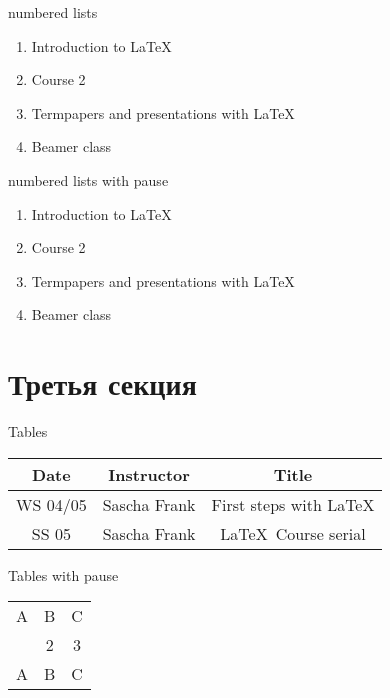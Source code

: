 \documentclass{beamer}
\begin{document}
\begin{frame}{numbered lists}
\begin{enumerate}
\item Introduction to  \LaTeX  
\item Course 2 
\item Termpapers and presentations with \LaTeX 
\item Beamer class
\end{enumerate}
\end{frame}


\begin{frame}{numbered lists with pause}
\begin{enumerate}
\item Introduction to  \LaTeX \pause 
\item Course 2 \pause 
\item Termpapers and presentations with \LaTeX \pause 
\item Beamer class
\end{enumerate}
\end{frame}


\section{Третья секция} 
\begin{frame}{Tables}
\begin{tabular}{|c|c|c|}
\hline
\textbf{Date} & \textbf{Instructor} & \textbf{Title} \\
\hline
WS 04/05 & Sascha Frank & First steps with  \LaTeX  \\
\hline
SS 05 & Sascha Frank & \LaTeX \ Course serial \\
\hline
\end{tabular}
\end{frame}


\begin{frame}{Tables with pause}
\begin{tabular}{c c c}
A & B & C \\ 
\pause 
1 & 2 & 3 \\  
\pause 
A & B & C \\ 
\end{tabular}
\end{frame}
\end{document}
